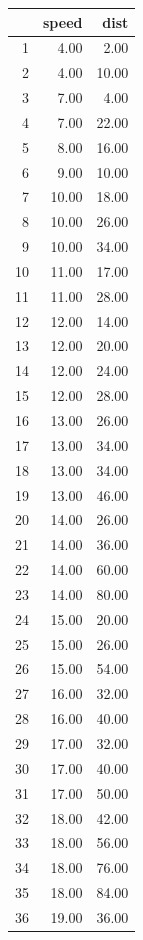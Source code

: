 \documentclass{article}
\begin{document}
\begin{table}[ht]
\centering
\begin{tabular}{rrr}
  \hline
 & speed & dist \\ 
  \hline
1 & 4.00 & 2.00 \\ 
  2 & 4.00 & 10.00 \\ 
  3 & 7.00 & 4.00 \\ 
  4 & 7.00 & 22.00 \\ 
  5 & 8.00 & 16.00 \\ 
  6 & 9.00 & 10.00 \\ 
  7 & 10.00 & 18.00 \\ 
  8 & 10.00 & 26.00 \\ 
  9 & 10.00 & 34.00 \\ 
  10 & 11.00 & 17.00 \\ 
  11 & 11.00 & 28.00 \\ 
  12 & 12.00 & 14.00 \\ 
  13 & 12.00 & 20.00 \\ 
  14 & 12.00 & 24.00 \\ 
  15 & 12.00 & 28.00 \\ 
  16 & 13.00 & 26.00 \\ 
  17 & 13.00 & 34.00 \\ 
  18 & 13.00 & 34.00 \\ 
  19 & 13.00 & 46.00 \\ 
  20 & 14.00 & 26.00 \\ 
  21 & 14.00 & 36.00 \\ 
  22 & 14.00 & 60.00 \\ 
  23 & 14.00 & 80.00 \\ 
  24 & 15.00 & 20.00 \\ 
  25 & 15.00 & 26.00 \\ 
  26 & 15.00 & 54.00 \\ 
  27 & 16.00 & 32.00 \\ 
  28 & 16.00 & 40.00 \\ 
  29 & 17.00 & 32.00 \\ 
  30 & 17.00 & 40.00 \\ 
  31 & 17.00 & 50.00 \\ 
  32 & 18.00 & 42.00 \\ 
  33 & 18.00 & 56.00 \\ 
  34 & 18.00 & 76.00 \\ 
  35 & 18.00 & 84.00 \\ 
  36 & 19.00 & 36.00 \\ 

\end{tabular}
\end{table}
\end{document}
